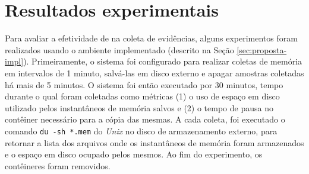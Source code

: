 
%

\section{Resultados experimentais}
\label{sec:proposta-exp}

Para avaliar a efetividade de \fancyname na coleta de evidências, alguns experimentos foram realizados usando o ambiente implementado (descrito na Seção \ref{sec:proposta-impl}).
%
Primeiramente, o sistema foi configurado para realizar coletas de memória em intervalos de 1 minuto, salvá-las em disco externo e apagar amostras coletadas há mais de 5 minutos. 
%
O sistema foi então executado por 30 minutos, tempo durante o qual foram coletadas como métricas (1) o uso de espaço em disco utilizado pelos instantâneos de memória salvos e (2) o tempo de pausa no contêiner necessário para a cópia das mesmas.
%
A cada coleta, foi executado o comando \texttt{du -sh *.mem} do \textit{Unix} no disco de armazenamento externo, para retornar a lista dos arquivos onde os instantâneos de memória foram armazenados e o espaço em disco ocupado pelos mesmos. 
%
Ao fim do experimento, os contêineres foram removidos.


